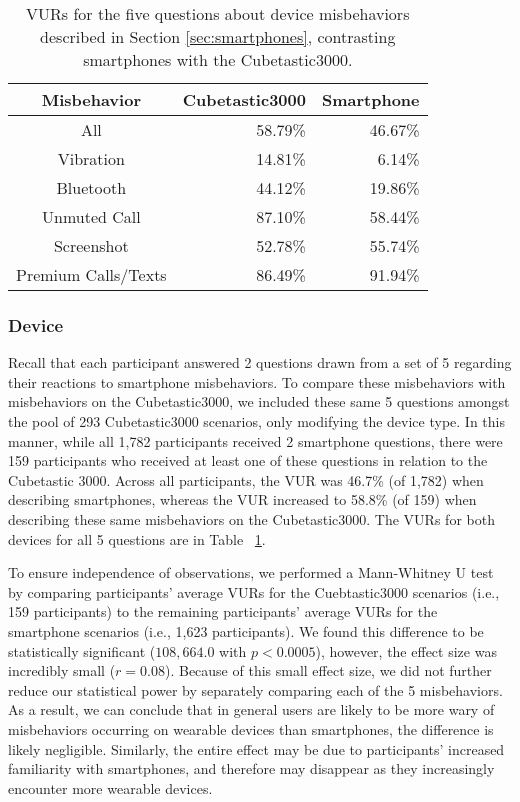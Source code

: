 

\begin{table}[t]
\begin{center}
\begin{tabular}{| c | r | r |}
\hline
 Misbehavior &  Cubetastic3000 & Smartphone \\
 \hline
 \hline
 All & 58.79\% & 46.67\%\\
 \hline
Vibration & 14.81\%  &  6.14\%\\
Bluetooth & 44.12\%  &  19.86\%\\
Unmuted Call & 87.10\%  &  58.44\%\\
Screenshot & 52.78\%  & 55.74\%\\
Premium Calls/Texts & 86.49\%  &  91.94\%\\ 
\hline
\end{tabular}
\caption{VURs for the five questions about device misbehaviors described in Section \ref{sec:smartphones}, contrasting smartphones with the Cubetastic3000.}
\label{deviceVUR}
\end{center}
\end{table}

\subsubsection{Device}
Recall that each participant answered 2 questions drawn from a set of 5 regarding their reactions to smartphone misbehaviors. To compare these misbehaviors with misbehaviors on the Cubetastic3000, we included these same 5 questions amongst the pool of 293 Cubetastic3000 scenarios, only modifying the device type. In this manner, while all 1,782 participants received 2 smartphone questions, there were 159 participants who received at least one of these questions in relation to the Cubetastic 3000. Across all participants, the VUR was 46.7\% (of 1,782) when describing smartphones, whereas the VUR increased to 58.8\% (of 159) when describing these same misbehaviors on the Cubetastic3000. The VURs for both devices for all 5 questions are in Table ~\ref{deviceVUR}.

To ensure independence of observations, we performed a Mann-Whitney U test by comparing participants' average VURs for the Cuebtastic3000 scenarios (i.e., 159 participants) to the remaining participants' average VURs for the smartphone scenarios (i.e., 1,623 participants). We found this difference to be statistically significant ($108,664.0$ with $p<0.0005$), however, the effect size was incredibly small ($r=0.08$). Because of this small effect size, we did not further reduce our statistical power by separately comparing each of the 5 misbehaviors. As a result, we can conclude that in general users are likely to be more wary of misbehaviors occurring on wearable devices than smartphones, the difference is likely negligible. Similarly, the entire effect may be due to participants' increased familiarity with smartphones, and therefore may disappear as they increasingly encounter more wearable devices.

